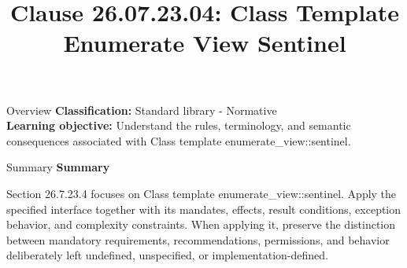\documentclass[10pt,letterpaper]{article}
\title{Clause 26.07.23.04: Class Template Enumerate View Sentinel}
\author{}
\date{}
\begin{document}
\maketitle
\begin{CornellOverviewBox}{Overview}
\textbf{Classification:} Standard library - Normative\\[2pt]
\textbf{Learning objective:} Understand the rules, terminology, and semantic consequences associated with Class template enumerate\_view::sentinel.
\end{CornellOverviewBox}\begin{CornellSummaryBox}{Summary}
{\sffamily\bfseries\color{Accent} Summary}\par\vspace{3pt}Section 26.7.23.4 focuses on Class template enumerate\_view::sentinel. Apply the specified interface together with its mandates, effects, result conditions, exception behavior, and complexity constraints. When applying it, preserve the distinction between mandatory requirements, recommendations, permissions, and behavior deliberately left undefined, unspecified, or implementation-defined.
\end{CornellSummaryBox}
\end{document}
